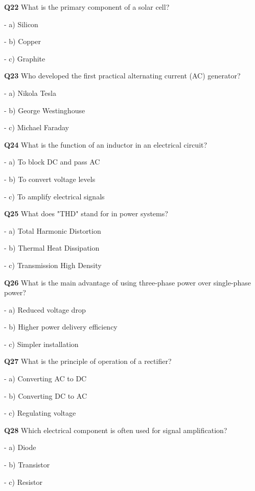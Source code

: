 \textbf{Q22} What is the primary component of a solar cell?\par
\quad - a) Silicon\par
\quad - b) Copper\par
\quad - c) Graphite\par

\textbf{Q23} Who developed the first practical alternating current (AC) generator?\par
\quad - a) Nikola Tesla\par
\quad - b) George Westinghouse\par
\quad - c) Michael Faraday\par

\textbf{Q24} What is the function of an inductor in an electrical circuit?\par
\quad - a) To block DC and pass AC\par
\quad - b) To convert voltage levels\par
\quad - c) To amplify electrical signals\par

\textbf{Q25} What does "THD" stand for in power systems?\par
\quad - a) Total Harmonic Distortion\par
\quad - b) Thermal Heat Dissipation\par
\quad - c) Transmission High Density\par

\textbf{Q26} What is the main advantage of using three-phase power over single-phase power?\par
\quad - a) Reduced voltage drop\par
\quad - b) Higher power delivery efficiency\par
\quad - c) Simpler installation\par

\textbf{Q27} What is the principle of operation of a rectifier?\par
\quad - a) Converting AC to DC\par
\quad - b) Converting DC to AC\par
\quad - c) Regulating voltage\par

\textbf{Q28} Which electrical component is often used for signal amplification?\par
\quad - a) Diode\par
\quad - b) Transistor\par
\quad - c) Resistor\par

